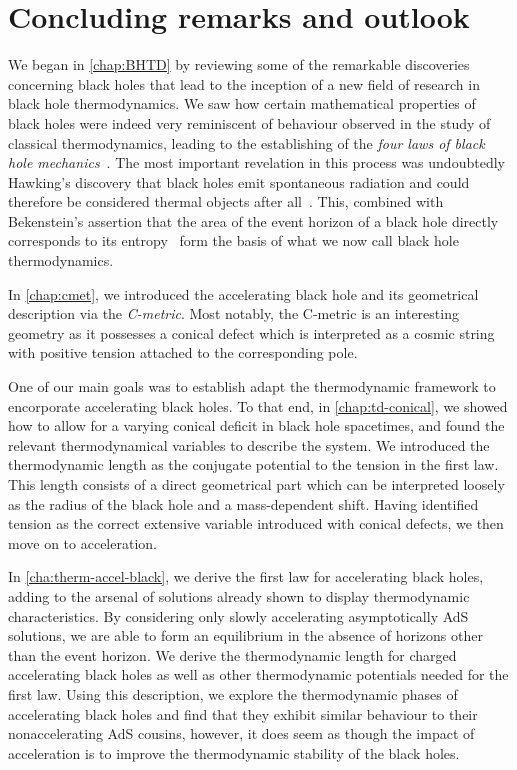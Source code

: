 \documentclass[
twoside,
openright,
frontopenright,
]{dmathesis}
\begin{document}
\chapter{Concluding remarks and outlook}

We began in \cref{chap:BHTD} by reviewing some of the remarkable
discoveries~\cite{Hawking:1971tu,Hawking:1971vc,Bekenstein:1972tm,Bekenstein:1973ur,Bardeen:1973gs,Bekenstein:1973mi,Bekenstein:1974ax,Hawking:1974rv,Hawking:1974sw,Hawking:1976de}
concerning black holes that lead to the inception of a new field of research in
black hole thermodynamics. We saw how certain mathematical properties of black
holes were indeed very reminiscent of behaviour observed in the study of
classical thermodynamics, leading to the establishing of the \emph{four laws of
  black hole mechanics}~\cite{Bardeen:1973gs}. The most important revelation in
this process was undoubtedly Hawking's discovery that black holes emit
spontaneous radiation and could therefore be considered thermal objects after
all~\cite{Hawking:1974rv,Hawking:1974sw}. This, combined with Bekenstein's
assertion that the area of the event horizon of a black hole directly
corresponds to its
entropy~\cite{Bekenstein:1972tm,Bekenstein:1973ur,Bekenstein:1974ax} form the
basis of what we now call black hole thermodynamics.

In \cref{chap:cmet}, we introduced the accelerating black hole and its
geometrical description via the \emph{C-metric}. Most notably, the C-metric is
an interesting geometry as it possesses a conical defect which is interpreted as
a cosmic string with positive tension attached to the corresponding pole.

One of our main goals was to establish adapt the thermodynamic framework to
encorporate accelerating black holes. To that end, in \cref{chap:td-conical}, we
showed how to allow for a varying conical deficit in black hole spacetimes, and
found the relevant thermodynamical variables to describe the system. We
introduced the thermodynamic length as the conjugate potential to the tension in
the first law. This length consists of a direct geometrical part which can be
interpreted loosely as the radius of the black hole and a mass-dependent
shift. Having identified tension as the correct extensive variable introduced
with conical defects, we then move on to acceleration.

In \cref{cha:therm-accel-black}, we derive the first law for accelerating black
holes, adding to the arsenal of solutions already shown to display thermodynamic
characteristics. By considering only slowly accelerating asymptotically AdS
solutions, we are able to form an equilibrium in the absence of horizons other
than the event horizon. We derive the thermodynamic length for charged
accelerating black holes as well as other thermodynamic potentials needed for
the first law. Using this description, we explore the thermodynamic phases of
accelerating black holes and find that they exhibit similar behaviour to their
nonaccelerating AdS cousins, however, it does seem as though the impact of
acceleration is to improve the thermodynamic stability of the black holes.
\end{document}

